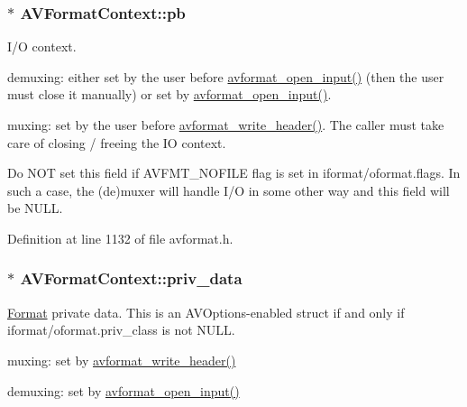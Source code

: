 \subsubsection[{\texorpdfstring{pb}{pb}}]{$\ast$ A\+V\+Format\+Context\+::pb}\hypertarget{struct_a_v_format_context_a1e7324262b6b78522e52064daaa7bc87}{}\label{struct_a_v_format_context_a1e7324262b6b78522e52064daaa7bc87}
I/O context.


\begin{DoxyItemize}
\item demuxing\+: either set by the user before \hyperlink{group__lavf__decoding_ga10a404346c646e4ab58f4ed798baca32}{avformat\+\_\+open\+\_\+input()} (then the user must close it manually) or set by \hyperlink{group__lavf__decoding_ga10a404346c646e4ab58f4ed798baca32}{avformat\+\_\+open\+\_\+input()}.
\item muxing\+: set by the user before \hyperlink{group__lavf__encoding_ga78d4e734fecb1d2385536e6dd5b7b9f5}{avformat\+\_\+write\+\_\+header()}. The caller must take care of closing / freeing the IO context.
\end{DoxyItemize}

Do N\+OT set this field if A\+V\+F\+M\+T\+\_\+\+N\+O\+F\+I\+LE flag is set in iformat/oformat.\+flags. In such a case, the (de)muxer will handle I/O in some other way and this field will be N\+U\+LL. 

Definition at line 1132 of file avformat.\+h.

\subsubsection[{\texorpdfstring{priv\+\_\+data}{priv_data}}]{$\ast$ A\+V\+Format\+Context\+::priv\+\_\+data}\hypertarget{struct_a_v_format_context_ac4c0777e54085af2f3f1b27130e2b21b}{}\label{struct_a_v_format_context_ac4c0777e54085af2f3f1b27130e2b21b}
\hyperlink{class_format}{Format} private data. This is an A\+V\+Options-\/enabled struct if and only if iformat/oformat.\+priv\+\_\+class is not N\+U\+LL.


\begin{DoxyItemize}
\item muxing\+: set by \hyperlink{group__lavf__encoding_ga78d4e734fecb1d2385536e6dd5b7b9f5}{avformat\+\_\+write\+\_\+header()}
\item demuxing\+: set by \hyperlink{group__lavf__decoding_ga10a404346c646e4ab58f4ed798baca32}{avformat\+\_\+open\+\_\+input()} 
\end{DoxyItemize}

